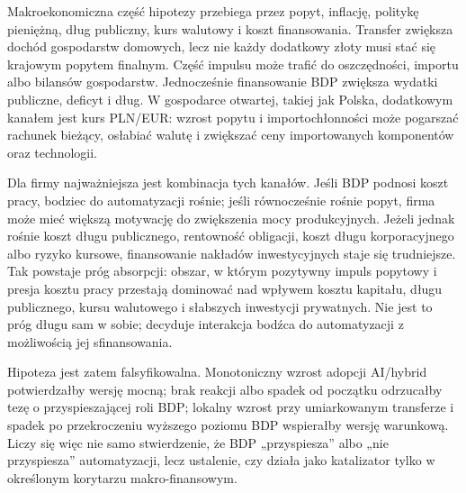 Makroekonomiczna część hipotezy przebiega przez popyt, inflację, politykę pieniężną, dług publiczny, kurs walutowy i koszt finansowania. Transfer zwiększa dochód gospodarstw domowych, lecz nie każdy dodatkowy złoty musi stać się krajowym popytem finalnym. Część impulsu może trafić do oszczędności, importu albo bilansów gospodarstw. Jednocześnie finansowanie BDP zwiększa wydatki publiczne, deficyt i dług. W gospodarce otwartej, takiej jak Polska, dodatkowym kanałem jest kurs PLN/EUR: wzrost popytu i importochłonności może pogarszać rachunek bieżący, osłabiać walutę i zwiększać ceny importowanych komponentów oraz technologii.

Dla firmy najważniejsza jest kombinacja tych kanałów. Jeśli BDP podnosi koszt pracy, bodziec do automatyzacji rośnie; jeśli równocześnie rośnie popyt, firma może mieć większą motywację do zwiększenia mocy produkcyjnych. Jeżeli jednak rośnie koszt długu publicznego, rentowność obligacji, koszt długu korporacyjnego albo ryzyko kursowe, finansowanie nakładów inwestycyjnych staje się trudniejsze. Tak powstaje próg absorpcji: obszar, w którym pozytywny impuls popytowy i presja kosztu pracy przestają dominować nad wpływem kosztu kapitału, długu publicznego, kursu walutowego i słabszych inwestycji prywatnych. Nie jest to próg długu sam w sobie; decyduje interakcja bodźca do automatyzacji z możliwością jej sfinansowania.

Hipoteza jest zatem falsyfikowalna. Monotoniczny wzrost adopcji AI/hybrid potwierdzałby wersję mocną; brak reakcji albo spadek od początku odrzucałby tezę o przyspieszającej roli BDP; lokalny wzrost przy umiarkowanym transferze i spadek po przekroczeniu wyższego poziomu BDP wspierałby wersję warunkową. Liczy się więc nie samo stwierdzenie, że BDP „przyspiesza” albo „nie przyspiesza” automatyzacji, lecz ustalenie, czy działa jako katalizator tylko w określonym korytarzu makro-finansowym.
